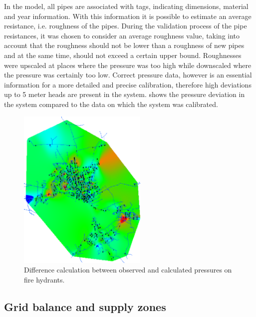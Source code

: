 In the model, all pipes are associated with tags, indicating dimensions, material and year information. With this information it is possible to estimate an average resistance, i.e. roughness of the pipes. 
During the validation process of the pipe resistances, it was chosen to consider an average roughness value, taking into account that the roughness should not be lower than a roughness of new pipes and at the same time, should not exceed a certain upper bound. Roughnesses were upscaled at places where the pressure was too high while downscaled where the pressure was certainly too low. Correct pressure data, however is an essential information for a more detailed and precise calibration, therefore high deviations up to 5 meter heads are present in the system.  shows the pressure deviation in the system compared to the data on which the system was calibrated. 

\begin{figure}[H]
\centering
\includegraphics[width=0.55\textwidth]{report/pictures/fire_hydrants}
% 
\caption{Difference calculation between observed and calculated pressures on fire hydrants\cite{verdo_doc}.}
\label{fig:pressure_mistakes}
\end{figure}

\vspace{-3mm}

\subsection{Grid balance and supply zones}
\label{grid_balance_supply_zones}

